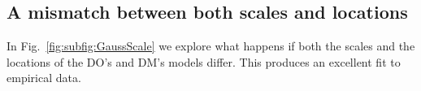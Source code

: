 \documentclass[a4paper, 12pt]{article}
\newcommand{\eref}[1]{(Eq.~\ref{eq:#1})}
\newcommand{\flabel}[1]{\label{fig:#1}}
\newcommand{\fref}[1]{Fig.~\ref{fig:#1}}
\newcommand{\seclabel}[1]{\label{sec:#1}}
\begin{document}
\FloatBarrier
\subsection{A mismatch between both scales and locations\seclabel{A_mismatch}}
In \fref{subfig:GaussScale} we explore what happens if both the scales and the locations of the DO's and DM's models differ. This produces an excellent fit to empirical data.
\end{document}
